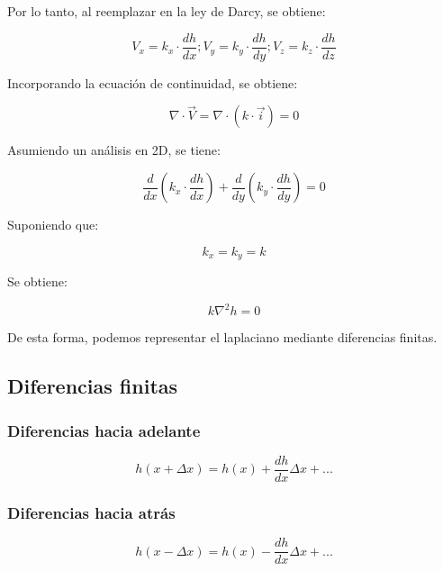 Por lo tanto, al reemplazar en la ley de Darcy, se obtiene:

\begin{equation}
    V_x = k_x\cdot \frac{dh}{dx}; V_y = k_y\cdot \frac{dh}{dy}; V_z = k_z\cdot \frac{dh}{dz}
\end{equation}

Incorporando la ecuación de continuidad, se obtiene:

\begin{equation}
    \nabla \cdot \vec{V} = \nabla \cdot (k \cdot \vec{i}) = 0
\end{equation}

Asumiendo un análisis en 2D, se tiene:

\begin{equation}
    \frac{d}{dx}(k_x \cdot \frac{dh}{dx}) + \frac{d}{dy}(k_y \cdot \frac{dh}{dy}) = 0
\end{equation}

Suponiendo que:

\begin{equation}
    k_x = k_y = k
\end{equation}

Se obtiene:

\begin{equation}
    k \nabla^2 h = 0
\end{equation}

De esta forma, podemos representar el laplaciano mediante diferencias finitas. \textbf{\cite{budhu_soil_2010}}

\subsection{Diferencias finitas}

\subsubsection{Diferencias hacia adelante}

\begin{equation}
    h(x + \Delta x) = h(x) + \frac{dh}{dx} \Delta x + ...
\end{equation}

\subsubsection{Diferencias hacia atrás}

\begin{equation}
    h(x - \Delta x) = h(x) - \frac{dh}{dx} \Delta x + ...
\end{equation}

